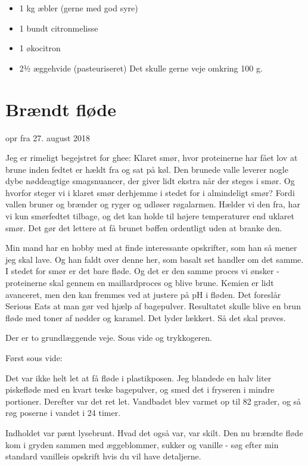 \documentclass[
]{book}
\providecommand{\tightlist}{%
  \setlength{\itemsep}{0pt}\setlength{\parskip}{0pt}}
\begin{document}
\begin{itemize}
\tightlist
\item
  1 kg æbler (gerne med god syre)
\item
  1 bundt citronmelisse
\item
  1 økocitron
\item
  2½ æggehvide (pasteuriseret) Det skulle gerne veje omkring 100 g.
\end{itemize}

\hypertarget{bruxe6ndt-fluxf8de}{%
\section{Brændt fløde}\label{bruxe6ndt-fluxf8de}}

opr fra 27. august 2018

Jeg er rimeligt begejstret for ghee: Klaret smør, hvor proteinerne har fået lov at brune inden fedtet er hældt fra og sat på køl. Den brunede valle leverer nogle dybe nøddeagtige smagsnuancer, der giver lidt ekstra når der steges i smør. Og hvorfor steger vi i klaret smør derhjemme i stedet for i almindeligt smør? Fordi vallen bruner og brænder og ryger og udløser røgalarmen. Hælder vi den fra, har vi kun smørfedtet tilbage, og det kan holde til højere temperaturer end uklaret smør. Det gør det lettere at få brunet bøffen ordentligt uden at branke den.

Min mand har en hobby med at finde interessante opskrifter, som han så mener jeg skal lave. Og han faldt over denne her, som basalt set handler om det samme. I stedet for smør er det bare fløde. Og det er den samme proces vi ønsker - proteinerne skal gennem en maillardproces og blive brune. Kemien er lidt avanceret, men den kan fremmes ved at justere på pH i fløden. Det foreslår Serious Eats at man gør ved hjælp af bagepulver. Resultatet skulle blive en brun fløde med toner af nødder og karamel. Det lyder lækkert. Så det skal prøves.

Der er to grundlæggende veje. Sous vide og trykkogeren.

Først sous vide:

Det var ikke helt let at få fløde i plastikposen. Jeg blandede en halv liter piskefløde med en kvart teske bagepulver, og smed det i fryseren i mindre portioner. Derefter var det ret let. Vandbadet blev varmet op til 82 grader, og så røg poserne i vandet i 24 timer.

Indholdet var pænt lysebrunt. Hvad det også var, var skilt. Den nu brændte fløde kom i gryden sammen med æggeblommer, sukker og vanille - søg efter min standard vanilleis opskrift hvis du vil have detaljerne.
\end{document}
